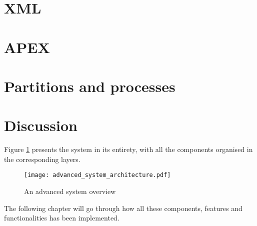 \section{XML}

\section{APEX}

\section{Partitions and processes}

\section{Discussion}

Figure \ref{fig:advanced_system} presents the system in its entirety,
with all the components organised in the corresponding layers.


\begin{figure}[H]
\centering
\texttt{[image: advanced\_system\_architecture.pdf]}

\caption{An advanced system overview}
\label{fig:advanced_system}
\end{figure}

The following chapter will go through how all these components,
features and functionalities has been implemented.

